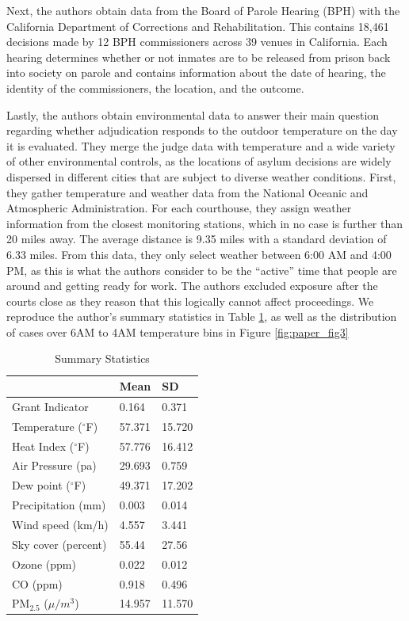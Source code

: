 \documentclass{article}
\begin{document}
	Next, the authors obtain data from the Board of Parole Hearing (BPH) with the California Department of Corrections and Rehabilitation. This contains 18,461 decisions made by 12 BPH commissioners across 39 venues in California. Each hearing determines whether or not inmates are to be released from prison back into society on parole and contains information about the date of hearing, the identity of the commissioners, the location, and the outcome. 
	
	Lastly, the authors obtain environmental data to answer their main question regarding whether adjudication responds to the outdoor temperature on the day it is evaluated. They merge the judge data with temperature and a wide variety of other environmental controls, as the locations of asylum decisions are widely dispersed in different cities that are subject to diverse weather conditions. First, they gather temperature and weather data from the National Oceanic and Atmospheric Administration. For each courthouse, they assign weather information from the closest monitoring stations, which in no case is further than 20 miles away. The average distance is 9.35 miles with a standard deviation of 6.33 miles. From this data, they only select weather between 6:00 AM and 4:00 PM, as this is what the authors consider to be the “active” time that people are around and getting ready for work. The authors excluded exposure after the courts close as they reason that this logically cannot affect proceedings. We reproduce the author's summary statistics in Table \ref{tab:summary_statistics}, as well as the distribution of cases over 6AM to 4AM temperature bins in Figure \ref{fig:paper_fig3}
	
	{\setlength{\tabcolsep}{1.5cm}
		\setlength{\belowcaptionskip}{10pt}
		\renewcommand{\arraystretch}{1.5}
		\begin{table}[h!]
			\caption{Summary Statistics}
			\centering
			\begin{tabular}{lll}\hline
				& Mean   & SD     \\ \hline
				Grant Indicator            & 0.164  & 0.371  \\
				Temperature ($^{\circ}$F)  & 57.371 & 15.720 \\
				Heat Index ($^{\circ}$F)   & 57.776 & 16.412 \\
				Air Pressure (pa)          & 29.693 & 0.759  \\
				Dew point ($^{\circ}$F)    & 49.371 & 17.202 \\
				Precipitation (mm)         & 0.003  & 0.014  \\
				Wind speed (km/h)          & 4.557  & 3.441  \\
				Sky cover (percent)        & 55.44  & 27.56  \\
				Ozone (ppm)                & 0.022  & 0.012  \\
				CO (ppm)                   & 0.918  & 0.496  \\
				PM$_{2.5}$ ($\mu/ m^3$)    & 14.957 & 11.570 \\ \hline
			\end{tabular}
			
			\label{tab:summary_statistics}\end{table}}
	
\end{document}
